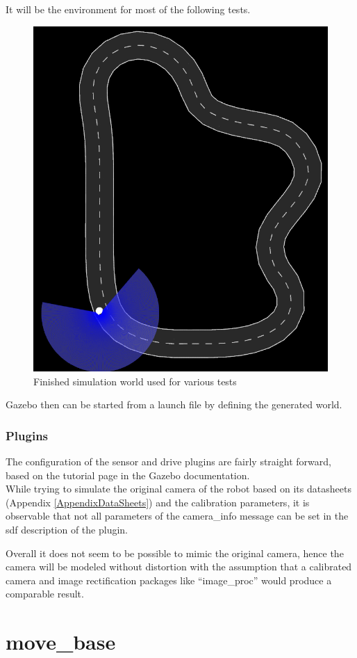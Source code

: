 It will be the environment for most of the following tests.

\begin{figure}
	\centering
	\includegraphics[width=.5\textwidth]{Pictures/test track}
	\caption{Finished simulation world used for various tests}
	\label{simworld}
\end{figure}

Gazebo then can be started from a launch file by defining the generated world.\\

\subsubsection{Plugins}
The configuration of the sensor and drive plugins are fairly straight forward, based on the tutorial page in the Gazebo documentation\cite{gazebotutorial}.\\



While trying to simulate the original camera of the robot based on its datasheets (Appendix \ref{AppendixDataSheets}) and the calibration parameters, it is observable that not all parameters of the camera\_info message can be set in the sdf description of the plugin.

Overall it does not seem to be possible to mimic the original camera, hence the camera will be modeled without distortion with the assumption that a calibrated camera and image rectification packages like ``image\_proc'' would produce a comparable result.








\section{move\_base}

